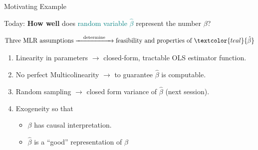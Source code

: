 \documentclass[11pt, aspectratio = 169]{beamer}
\begin{document}
\begin{frame}[fragile]{Motivating Example}
\begin{center}
    Today: \textbf{How well} does \textcolor{teal}{random variable} \textcolor{teal}{$\hat{\beta}$} represent the \alert{number} \alert{$\beta$}?
\end{center}
\pause
$$
\text{Three MLR assumptions} \xrightarrow{\quad \text{determine} \quad} \text{feasibility and properties of } \textcolor{teal}{\hat{\beta}}
$$
\pause
\begin{enumerate}
        \item Linearity in parameters $\rightarrow$ closed-form, tractable OLS estimator function.
        \item No perfect Multicolinearity $\rightarrow$ to guarantee $\hat{\beta}$ is computable.
        \item Random sampling $\rightarrow$ closed form variance of $\hat{\beta}$ (next session).
        \item Exogeneity so that
        \begin{itemize}
            \item[$\rightarrow$] $\beta$ has causal interpretation. 
            \item[$\rightarrow$] $\hat{\beta}$ is a ``good'' representation of $\beta$
        \end{itemize}
\end{enumerate}
\end{frame}

\end{document}
